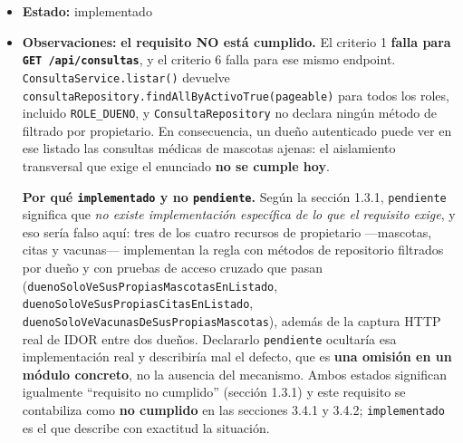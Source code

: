 \documentclass[
  spanish,
]{article}
\begin{document}
\begin{itemize}
  \texttt{Mascota\allowbreak{}Repository.\allowbreak{}find\allowbreak{}All\allowbreak{}By\allowbreak{}Duenio\allowbreak{}Id\allowbreak{}And\allowbreak{}Activo\allowbreak{}True},
  \texttt{Cita\allowbreak{}Repository.\allowbreak{}find\allowbreak{}All\allowbreak{}By\allowbreak{}Mascota\_\allowbreak{}Duenio\_\allowbreak{}Id\allowbreak{}And\allowbreak{}Activo\allowbreak{}True},
  \texttt{Vacuna\allowbreak{}Repository.\allowbreak{}find\allowbreak{}All\allowbreak{}By\allowbreak{}Mascota\_\allowbreak{}Duenio\_\allowbreak{}Id\allowbreak{}And\allowbreak{}Activo\allowbreak{}True}
  (\textbf{no existe el equivalente en \texttt{Consulta\allowbreak{}Repository}});
  matriz de permisos, sección 2.8; evidencia
  \texttt{docs/\allowbreak{}mediciones/\allowbreak{}sec/\allowbreak{}A01-\allowbreak{}access-\allowbreak{}control.\allowbreak{}md}; control OWASP A01;
  requisito funcional relacionado REQ-F-006.
\item
  \textbf{Estado:} implementado
\item
  \textbf{Observaciones:} \textbf{el requisito NO está cumplido.} El
  criterio 1 \textbf{falla para \texttt{GET\ /\allowbreak{}api/\allowbreak{}consultas}}, y el
  criterio 6 falla para ese mismo endpoint.
  \texttt{Consulta\allowbreak{}Service.\allowbreak{}listar()} devuelve
  \texttt{consulta\allowbreak{}Repository.\allowbreak{}find\allowbreak{}All\allowbreak{}By\allowbreak{}Activo\allowbreak{}True(pageable)} para todos
  los roles, incluido \texttt{ROLE\_\allowbreak{}DUENO}, y
  \texttt{Consulta\allowbreak{}Repository} no declara ningún método de filtrado por
  propietario. En consecuencia, un dueño autenticado puede ver en ese
  listado las consultas médicas de mascotas ajenas: el aislamiento
  transversal que exige el enunciado \textbf{no se cumple hoy}.

  \textbf{Por qué \texttt{implementado} y no \texttt{pendiente}.} Según
  la sección 1.3.1, \texttt{pendiente} significa que \emph{no existe
  implementación específica de lo que el requisito exige}, y eso sería
  falso aquí: tres de los cuatro recursos de propietario ---mascotas,
  citas y vacunas--- implementan la regla con métodos de repositorio
  filtrados por dueño y con pruebas de acceso cruzado que pasan
  (\texttt{dueno\allowbreak{}Solo\allowbreak{}Ve\allowbreak{}Sus\allowbreak{}Propias\allowbreak{}Mascotas\allowbreak{}En\allowbreak{}Listado},
  \texttt{dueno\allowbreak{}Solo\allowbreak{}Ve\allowbreak{}Sus\allowbreak{}Propias\allowbreak{}Citas\allowbreak{}En\allowbreak{}Listado},
  \texttt{dueno\allowbreak{}Solo\allowbreak{}Ve\allowbreak{}Vacunas\allowbreak{}De\allowbreak{}Sus\allowbreak{}Propias\allowbreak{}Mascotas}), además de la captura
  HTTP real de IDOR entre dos dueños. Declararlo \texttt{pendiente}
  ocultaría esa implementación real y describiría mal el defecto, que es
  \textbf{una omisión en un módulo concreto}, no la ausencia del
  mecanismo. Ambos estados significan igualmente ``requisito no
  cumplido'' (sección 1.3.1) y este requisito se contabiliza como
  \textbf{no cumplido} en las secciones 3.4.1 y 3.4.2;
  \texttt{implementado} es el que describe con exactitud la situación.


\end{itemize}
\end{document}
